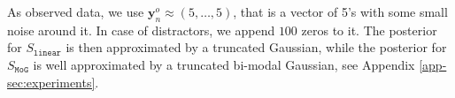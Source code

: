 \documentclass[twoside]{article}
\newcommand{\thb}{\boldsymbol{\theta}}
\newcommand{\yb}{\mathbf{y}}
\newcommand{\data}{\mathbf{y}^o}
\newcommand{\rromc}{R2OMC}
\begin{document}
As observed data, we use $\data_n \approx (5, \ldots, 5)$, that is a vector of 5's with some small noise around it. In case of distractors, we append $100$ zeros to it. 
The posterior for $S_{\mathtt{linear}}$ is then approximated by a truncated Gaussian, while the posterior for $S_{\mathtt{MoG}}$ is well approximated by a truncated bi-modal Gaussian, see Appendix \ref{app-sec:experiments}. 



\end{document}
